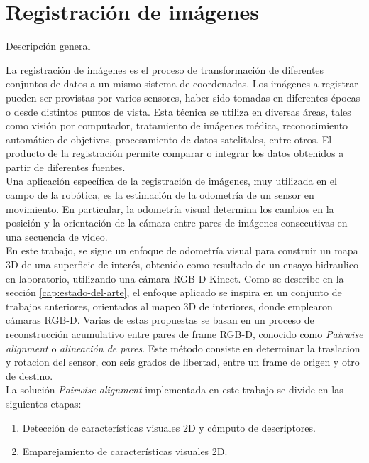 	 	 	

\chapter{Registración de imágenes}

\begin{section}{Descripción general}
\label{sec:descripcion-general-registracion}

La registración de imágenes es el proceso de transformación de diferentes conjuntos de datos a un mismo sistema de coordenadas. Los imágenes a registrar pueden ser provistas por varios sensores, haber sido tomadas en diferentes épocas o desde distintos puntos de vista. Esta técnica se utiliza en diversas áreas, tales como visión por computador, tratamiento de imágenes médica, reconocimiento automático de objetivos, procesamiento de datos satelitales, entre otros. El producto de la registración permite comparar o integrar los datos obtenidos a partir de diferentes fuentes. \\
Una aplicación específica de la registración de imágenes, muy utilizada en el campo de la robótica, es la estimación de la odometría de un sensor en movimiento. En particular, la odometría visual determina los cambios en la posición y la orientación de la cámara entre pares de imágenes consecutivas en una secuencia de video. \\
En este trabajo, se sigue un enfoque de odometría visual para construir un mapa 3D de una superficie de interés, obtenido como resultado de un ensayo hidraulico en laboratorio, utilizando una cámara RGB-D Kinect. Como se describe en la sección \ref{cap:estado-del-arte}, el enfoque aplicado se inspira en un conjunto de trabajos anteriores, orientados al mapeo 3D de interiores, donde emplearon cámaras RGB-D. Varias de estas propuestas se basan en un proceso de reconstrucción acumulativo entre pares de frame RGB-D, conocido como \textit{Pairwise alignment} o \textit{alineación de pares}. Este método consiste en determinar la traslacion y rotacion del sensor, con seis grados de libertad, entre un frame de origen y otro de destino. \\
La solución \textit{Pairwise alignment} implementada en este trabajo se divide en las siguientes etapas:
\begin{enumerate}
\item Detección de características visuales 2D y cómputo de descriptores.

\item Emparejamiento de características visuales 2D.


\end{enumerate}
\end{section}
